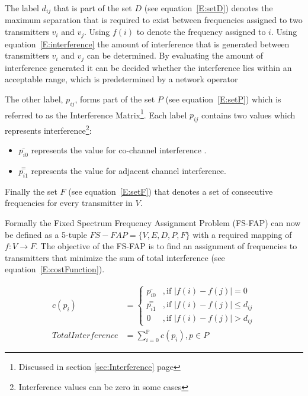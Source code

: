 The label $d_{ij}$ that is part of the set $D$ (see equation~\ref{E:setD}) denotes the maximum separation that is required to exist between frequencies assigned to two transmitters $v_i$ and $v_j$. Using $f(i)$ to denote the frequency assigned to $i$. Using equation~\ref{E:interference} the amount of interference that is generated between transmitters $v_i$ and $v_j$ can be determined. By evaluating the amount of interference generated it can be decided whether the interference lies within an acceptable range, which is predetermined by a network operator\cite{FAPOrientationModel,TabuMontemanniSmith}

The other label, $p_{ij}$, forms part of the set $P$ (see equation~\ref{E:setP}) which is referred to as the Interference Matrix\footnote{Discussed in section \ref{sec:Interference} page \pageref{sec:Interference}}. Each label $p_{ij}$ contains two values which represents interference\footnote{Interference values can be zero in some cases}:
\begin{itemize}
\item $\bar{p_{i0}}$ represents the value for co-channel interference \cite{FAPOrientationModel,TabuMontemanniSmith}. 
\item $\overset{=}{p_{i1}}$ represents the value for adjacent channel interference\cite{FAPOrientationModel,TabuMontemanniSmith}.
\end{itemize}

Finally the set $F$ (see equation~\ref{E:setF}) that denotes a set of consecutive frequencies for every transmitter in $V$\cite{FAPOrientationModel,TabuMontemanniSmith}.

Formally the Fixed Spectrum Frequency Assignment Problem (FS-FAP) can now be defined as a 5-tuple \(FS-FAP = \{V,E,D,P,F\}\) with a required mapping of \(f: V \rightarrow F\)\cite{TabuMontemanniSmith}. The objective of the FS-FAP is to find an assignment of frequencies to transmitters that minimize the sum of total interference (see equation~\ref{E:costFunction}).

\begin{align} 
 c(p_i) &= 
 \begin{cases}
	\bar{p_{i0}} &,\text{if $|f(i) - f(j)| = 0$}\\
	\overset{=}{p_{i1}} &, \text{if $|f(i) - f(j)| \leqslant d_{ij}$}\\
	0 &,\text{if $|f(i) - f(j)| > d_{ij}$}
 \end{cases}\\
 \label{E:costFunction}
 Total Interference &= \sum^\mathbb{P}_{i = 0}c(p_i),p \in P 
\end{align}

